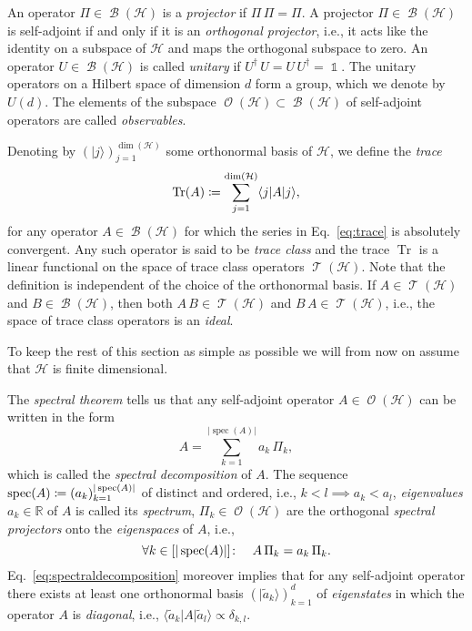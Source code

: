 \documentclass[a4paper,12pt,listof=totoc,index=totoc,bibliography=totoc,headsepline=false,headings=normal,BCOR16.153846mm,DIV12,headinclude,twoside,cleardoublepage=empty,numbers=noenddot,final]{scrreprt}
\theoremstyle{mystyle}
\numberwithin{equation}{section}
\numberwithin{figure}{section}
\numberwithin{lemma}{section}
\numberwithin{theorem}{section}
\numberwithin{corollary}{section}
\numberwithin{definition}{section}
\numberwithin{conjecture}{section}
\numberwithin{observation}{section}
\newcommand{\+}{\mkern2mu}
\newcommand{\coloneqq}{\mathrel{\vcentcolon\mkern-1.2mu=}} %
\newcommand{\texteqref}[1]{Eq.~\eqref{#1}}
\newcommand{\itholds}{\colon\mathchoice{\quad}{}{}{}}
\newcommand{\bra}[1]{\langle #1|}
\newcommand{\ket}[1]{|#1\rangle}
\newcommand{\ad}{^\dagger}
\DeclareMathOperator{\1}{\mathds{1}}
\DeclareMathOperator{\Bop}{\mathcal{B}}
\DeclareMathOperator{\Tcl}{\mathcal{T}}
\DeclareMathOperator{\Obs}{\mathcal{O}}
\DeclareMathOperator{\Tr}{Tr}
\DeclareMathOperator{\spec}{spec}
\newcommand{\mc}[1]{\mathcal{#1}}
\newcommand{\mcH}{\mc{H}}
\newcommand{\mb}[1]{\mathbb{#1}}
\newcommand{\R}{\mb{R}}
\begin{document}
An operator $\Pi \in \Bop(\mcH)$ is a \emph{projector} if $\Pi\,\Pi = \Pi$.
A projector $\Pi \in \Bop(\mcH)$ is self-adjoint if and only if it is an \emph{orthogonal projector}, i.e., it acts like the identity on a subspace of $\mcH$ and maps the orthogonal subspace to zero.
An operator $U \in \Bop(\mcH)$ is called \emph{unitary} if $U\ad\,U = U\,U\ad = \1$.
The unitary operators on a Hilbert space of dimension $d$ form a group, which we denote by $U(d)$.
The elements of the subspace $\Obs(\mcH) \subset \Bop(\mcH)$ of self-adjoint operators are called \emph{observables}.

Denoting by $(\ket j)_{j=1}^{\dim(\mcH)}$ some orthonormal basis of $\mcH$, we define the \emph{trace} 
\begin{equation} \label{eq:trace}
  \Tr(A) \coloneqq \sum_{j=1}^{\dim(\mcH)} \bra j A \ket j ,
\end{equation}
for any operator $A \in \Bop(\mcH)$ for which the series in \texteqref{eq:trace} is absolutely convergent.
Any such operator is said to be \emph{trace class} and the trace $\Tr$ is a linear functional on the space of trace class operators $\Tcl(\mcH)$.
Note that the definition is independent of the choice of the orthonormal basis.
If $A \in \Tcl(\mcH)$ and $B \in \Bop(\mcH)$, then both $A\,B \in \Tcl(\mcH)$ and $B\,A \in \Tcl(\mcH)$, i.e., the space of trace class operators is an \emph{ideal}.

To keep the rest of this section as simple as possible we will from now on assume that $\mcH$ is finite dimensional.

The \emph{spectral theorem} tells us that any self-adjoint operator $A \in \Obs(\mcH)$ can be written in the form
\begin{equation} \label{eq:spectraldecomposition}
  A = \sum_{k=1}^{|\spec(A)|} a_k\,\Pi_k ,
\end{equation}
which is called the \emph{spectral decomposition} of $A$.
The sequence $\spec(A) \coloneqq (a_k)_{k=1}^{|\spec(A)|}$ of distinct and ordered, i.e., $k<l \implies a_k < a_l$, \emph{eigenvalues} $a_k \in \R$ of $A$ is called its \emph{spectrum}, $\Pi_k \in \Obs(\mcH)$ are the orthogonal \emph{spectral projectors} onto the \emph{eigenspaces} of $A$, i.e.,
\begin{equation}
  \forall k \in [|\spec(A)|]\itholds A\,\Pi_k = a_k\,\Pi_k .
\end{equation}
\texteqref{eq:spectraldecomposition} moreover implies that for any self-adjoint operator there exists at least one orthonormal basis $(\ket{\tilde{a}_k})_{k=1}^d$ of \emph{eigenstates} in which the operator $A$ is \emph{diagonal}, i.e., $\bra{\tilde{a}_k} A \ket{\tilde{a}_l} \propto \delta_{k,l}$.
\end{document}
